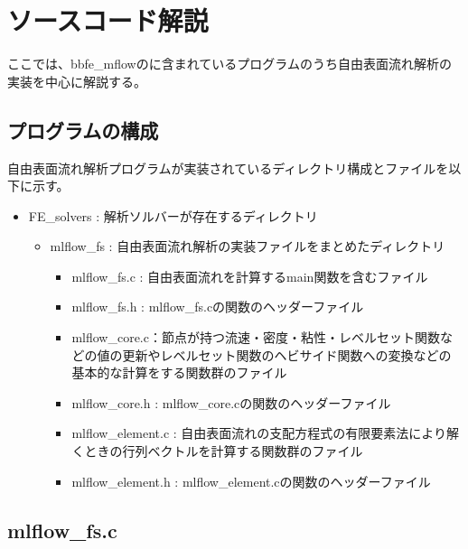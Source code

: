\newpage
\section{ソースコード解説}
ここでは、bbfe\_mflowのに含まれているプログラムのうち自由表面流れ解析の実装を中心に解説する。

\subsection{プログラムの構成}
自由表面流れ解析プログラムが実装されているディレクトリ構成とファイルを以下に示す。

\begin{itemize}
	\item FE\_solvers : 解析ソルバーが存在するディレクトリ
  \begin{itemize}
    \item mlflow\_fs : 自由表面流れ解析の実装ファイルをまとめたディレクトリ
    \begin{itemize}
    	\item mlflow\_fs.c : 自由表面流れを計算するmain関数を含むファイル
    	\item mlflow\_fs.h : mlflow\_fs.cの関数のヘッダーファイル
    	\item mlflow\_core.c：節点が持つ流速・密度・粘性・レベルセット関数などの値の更新やレベルセット関数のヘビサイド関数への変換などの基本的な計算をする関数群のファイル
    	\item mlflow\_core.h : mlflow\_core.cの関数のヘッダーファイル
    	\item mlflow\_element.c : 自由表面流れの支配方程式の有限要素法により解くときの行列ベクトルを計算する関数群のファイル
    	\item mlflow\_element.h : mlflow\_element.cの関数のヘッダーファイル
    \end{itemize}
  \end{itemize}
\end{itemize}

\subsection{mlflow\_fs.c}
